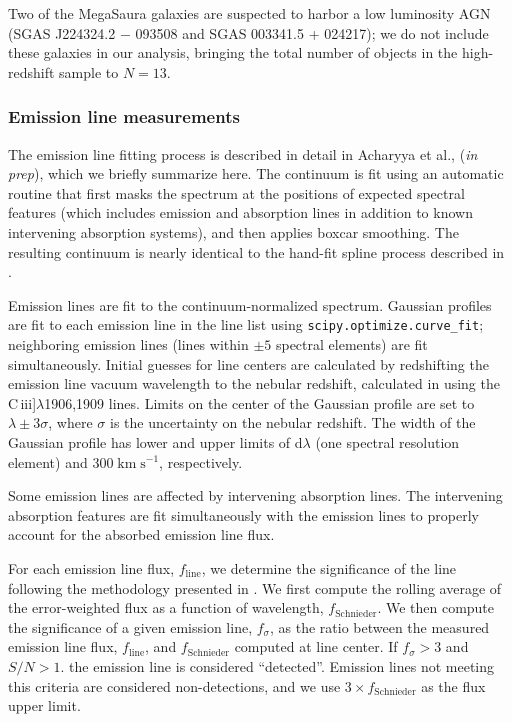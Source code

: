\documentclass[preprint2]{aastex62}
\newcommand{\ciii}{C\,{\sc iii}]\xspace}
\newcommand{\kms}{\ensuremath{\;\mathrm{km}\;\mathrm{s}^{-1}}\xspace}
\newcommand{\mage}{{\sc Meg}a{\sc S}a{\sc ura}\xspace}
\begin{document}
Two of the \mage galaxies are suspected to harbor a low luminosity AGN (SGAS J224324.2 − 093508 and SGAS 003341.5 + 024217); we do not include these galaxies in our analysis, bringing the total number of objects in the high-redshift sample to $N=13$.

\subsubsection{Emission line measurements}

The emission line fitting process is described in detail in Acharyya et al., (\emph{in prep}), which we briefly summarize here. The continuum is fit using an automatic routine that first masks the spectrum at the positions of expected spectral features (which includes emission and absorption lines in addition to known intervening absorption systems), and then applies boxcar smoothing. The resulting continuum is nearly identical to the hand-fit spline process described in \citet{Rigby+2018a}. 

Emission lines are fit to the continuum-normalized spectrum. Gaussian profiles are fit to each emission line in the line list using {\tt scipy.optimize.curve\_fit}; neighboring emission lines (lines within $\pm 5$ spectral elements) are fit simultaneously. Initial guesses for line centers are calculated by redshifting the emission line vacuum wavelength to the nebular redshift, calculated in \citet{Rigby+2018a} using the \ciii$\lambda$1906,1909 lines. Limits on the center of the Gaussian profile are set to $\lambda \pm 3\sigma$, where $\sigma$ is the uncertainty on the nebular redshift. The width of the Gaussian profile has lower and upper limits of d$\lambda$ (one spectral resolution element) and 300\kms, respectively.

Some emission lines are affected by intervening absorption lines. The intervening absorption features are fit simultaneously with the emission lines to properly account for the absorbed emission line flux.

For each emission line flux, $f_{\mathrm{line}}$, we determine the significance of the line following the methodology presented in \citet{Schnieider+1993}. We first compute the rolling average of the error-weighted flux as a function of wavelength, $f_{\mathrm{Schnieder}}$. We then compute the significance of a given emission line, $f_{\sigma}$, as the ratio between the measured emission line flux, $f_{\mathrm{line}}$, and $f_{\mathrm{Schnieder}}$ computed at line center. If $f_{\sigma}>3$ and $S/N > 1$. the emission line is considered ``detected''. Emission lines not meeting this criteria are considered non-detections, and we use $3\times f_{\mathrm{Schnieder}}$ as the flux upper limit.
\end{document}
